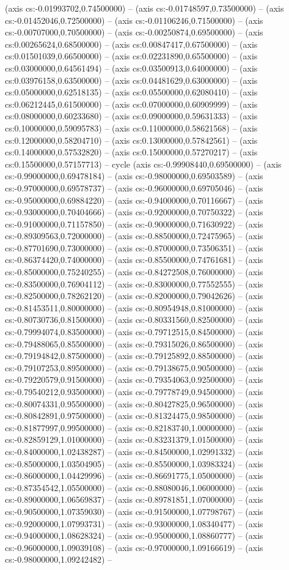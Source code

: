 (axis cs:-0.01993702,0.74500000) -- (axis cs:-0.01748597,0.73500000) -- (axis cs:-0.01452046,0.72500000) -- (axis cs:-0.01106246,0.71500000) -- (axis cs:-0.00707000,0.70500000) -- (axis cs:-0.00250874,0.69500000) -- (axis cs:0.00265624,0.68500000) -- (axis cs:0.00847417,0.67500000) -- (axis cs:0.01501039,0.66500000) -- (axis cs:0.02231890,0.65500000) -- (axis cs:0.03000000,0.64561494) -- (axis cs:0.03500913,0.64000000) -- (axis cs:0.03976158,0.63500000) -- (axis cs:0.04481629,0.63000000) -- (axis cs:0.05000000,0.62518135) -- (axis cs:0.05500000,0.62080410) -- (axis cs:0.06212445,0.61500000) -- (axis cs:0.07000000,0.60909999) -- (axis cs:0.08000000,0.60233680) -- (axis cs:0.09000000,0.59631333) -- (axis cs:0.10000000,0.59095783) -- (axis cs:0.11000000,0.58621568) -- (axis cs:0.12000000,0.58204710) -- (axis cs:0.13000000,0.57842561) -- (axis cs:0.14000000,0.57532820) -- (axis cs:0.15000000,0.57270217) -- (axis cs:0.15500000,0.57157713) -- cycle (axis cs:-0.99908440,0.69500000) -- (axis cs:-0.99000000,0.69478184) -- (axis cs:-0.98000000,0.69503589) -- (axis cs:-0.97000000,0.69578737) -- (axis cs:-0.96000000,0.69705046) -- (axis cs:-0.95000000,0.69884220) -- (axis cs:-0.94000000,0.70116667) -- (axis cs:-0.93000000,0.70404666) -- (axis cs:-0.92000000,0.70750322) -- (axis cs:-0.91000000,0.71157850) -- (axis cs:-0.90000000,0.71630922) -- (axis cs:-0.89309563,0.72000000) -- (axis cs:-0.88500000,0.72475965) -- (axis cs:-0.87701690,0.73000000) -- (axis cs:-0.87000000,0.73506351) -- (axis cs:-0.86374420,0.74000000) -- (axis cs:-0.85500000,0.74761681) -- (axis cs:-0.85000000,0.75240255) -- (axis cs:-0.84272508,0.76000000) -- (axis cs:-0.83500000,0.76904112) -- (axis cs:-0.83000000,0.77552555) -- (axis cs:-0.82500000,0.78262120) -- (axis cs:-0.82000000,0.79042626) -- (axis cs:-0.81453511,0.80000000) -- (axis cs:-0.80954948,0.81000000) -- (axis cs:-0.80730736,0.81500000) -- (axis cs:-0.80331560,0.82500000) -- (axis cs:-0.79994074,0.83500000) -- (axis cs:-0.79712515,0.84500000) -- (axis cs:-0.79488065,0.85500000) -- (axis cs:-0.79315026,0.86500000) -- (axis cs:-0.79194842,0.87500000) -- (axis cs:-0.79125892,0.88500000) -- (axis cs:-0.79107253,0.89500000) -- (axis cs:-0.79138675,0.90500000) -- (axis cs:-0.79220579,0.91500000) -- (axis cs:-0.79354063,0.92500000) -- (axis cs:-0.79540212,0.93500000) -- (axis cs:-0.79778749,0.94500000) -- (axis cs:-0.80074331,0.95500000) -- (axis cs:-0.80427825,0.96500000) -- (axis cs:-0.80842891,0.97500000) -- (axis cs:-0.81324475,0.98500000) -- (axis cs:-0.81877997,0.99500000) -- (axis cs:-0.82183740,1.00000000) -- (axis cs:-0.82859129,1.01000000) -- (axis cs:-0.83231379,1.01500000) -- (axis cs:-0.84000000,1.02438287) -- (axis cs:-0.84500000,1.02991332) -- (axis cs:-0.85000000,1.03504905) -- (axis cs:-0.85500000,1.03983324) -- (axis cs:-0.86000000,1.04429996) -- (axis cs:-0.86691775,1.05000000) -- (axis cs:-0.87354542,1.05500000) -- (axis cs:-0.88080046,1.06000000) -- (axis cs:-0.89000000,1.06569837) -- (axis cs:-0.89781851,1.07000000) -- (axis cs:-0.90500000,1.07359030) -- (axis cs:-0.91500000,1.07798767) -- (axis cs:-0.92000000,1.07993731) -- (axis cs:-0.93000000,1.08340477) -- (axis cs:-0.94000000,1.08628324) -- (axis cs:-0.95000000,1.08860777) -- (axis cs:-0.96000000,1.09039108) -- (axis cs:-0.97000000,1.09166619) -- (axis cs:-0.98000000,1.09242482) -- 